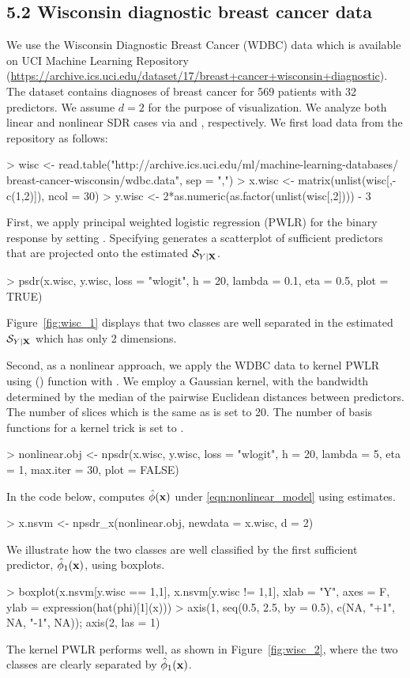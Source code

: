 \subsection{5.2 Wisconsin diagnostic breast cancer data}
\label{sec:realdata_wisc}
We use the Wisconsin Diagnostic Breast Cancer (WDBC) data which is available on UCI Machine Learning Repository (\url{https://archive.ics.uci.edu/dataset/17/breast+cancer+wisconsin+diagnostic}). The dataset contains diagnoses of breast cancer for 569 patients with 32 predictors. We assume ${d} =2$ for the purpose of visualization. We analyze both linear and nonlinear SDR cases via  and , respectively. We first load data from the repository as follows:
\begin{example}
 > wisc <- read.table("http://archive.ics.uci.edu/ml/machine-learning-databases/
                     breast-cancer-wisconsin/wdbc.data", sep = ",")
 > x.wisc <- matrix(unlist(wisc[,-c(1,2)]), ncol = 30)
 > y.wisc <- 2*as.numeric(as.factor(unlist(wisc[,2]))) - 3
\end{example} 
First, we apply principal weighted logistic regression (PWLR) for the binary response by setting . Specifying  generates a scatterplot of sufficient predictors that are projected onto the estimated $\mathcal{S}_{Y\mid \mathbf{X}}$.
\begin{example}
 > psdr(x.wisc, y.wisc, loss = "wlogit", h = 20, lambda = 0.1, eta = 0.5, plot = TRUE)
\end{example}
Figure~\ref{fig:wisc_1} displays that two classes are well separated in the estimated $\mathcal{S}_{Y\mid \mathbf{X}}$ which has only 2 dimensions.

Second, as a nonlinear approach, we apply the WDBC data to kernel PWLR \citep{shin2017principal} using () function with .
We employ a Gaussian kernel, with the bandwidth determined by the median of the pairwise Euclidean distances between predictors.
The number of slices which is the same as  is set to 20. The number of basis functions for a kernel trick is set to .
\begin{example}
 > nonlinear.obj <- npsdr(x.wisc, y.wisc, loss = "wlogit", h = 20, lambda = 5, eta = 1,
                           max.iter = 30, plot = FALSE)
\end{example}   
In the code below,  computes $\hat\phi(\mathbf{x})$ under \eqref{eqn:nonlinear_model} using  estimates.
\begin{example}
 > x.nsvm <- npsdr_x(nonlinear.obj, newdata = x.wisc, d = 2)
\end{example}   
We illustrate how the two classes are well classified by the first sufficient predictor, $\hat{\phi}_1(\mathbf{x})$, using boxplots.\begin{example} 
 > boxplot(x.nsvm[y.wisc == 1,1], x.nsvm[y.wisc != 1,1], xlab = "Y", axes = F,
          ylab = expression(hat(phi)[1](x)))
 > axis(1, seq(0.5, 2.5, by = 0.5), c(NA, "+1", NA, "-1", NA)); axis(2, las = 1)
\end{example}
The kernel PWLR performs well, as shown in Figure~\ref{fig:wisc_2}, where the two classes are clearly separated by $\hat{\phi}_1(\mathbf{x})$.

